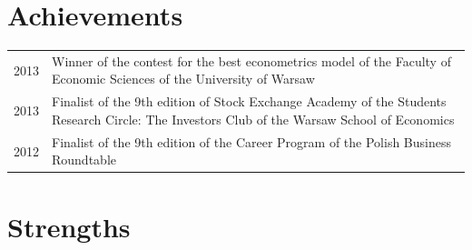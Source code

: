 \documentclass{cls/gml_cv_sets}
\begin{document}
\begin{paracol}{2}
\vspace{-0.25cm}
\begin{minipage}[t]{0.6\textwidth}
    \section{Achievements}
    \begin{tabular}{>{\footnotesize}r >{\footnotesize}p{}}
        2013 & Winner of the contest for the best econometrics model of the 
        Faculty of Economic Sciences of the University of Warsaw \\
        2013 & Finalist of the 9th edition of Stock Exchange Academy of the 
        Students Research Circle: The Investors Club of the Warsaw School of 
        Economics \\
        2012 & Finalist of the 9th edition of the Career Program of the 
        Polish Business Roundtable
    \end{tabular}
\end{minipage}

\section{Strengths}
\begin{center}
\end{center}

\clearpage
\end{paracol}
\end{document}
